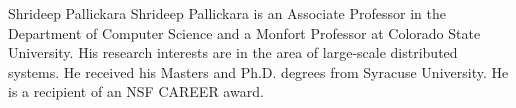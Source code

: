 \documentclass[9pt,journal,compsoc]{IEEEtran}
\begin{document}
%
\vspace{-1.56cm}
\begin{IEEEbiography}{Shrideep Pallickara}
Shrideep Pallickara is an Associate Professor in the Department of Computer Science and a Monfort Professor at Colorado State University. His research interests are in the area of large-scale distributed systems. He received his Masters and Ph.D. degrees from Syracuse University. He is a recipient of an NSF CAREER award.
\enlargethispage{0.7cm}
\end{IEEEbiography}
\end{document}
